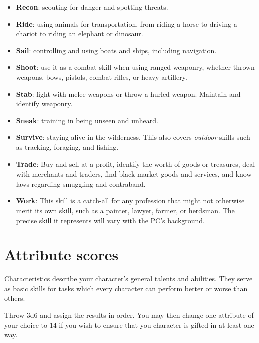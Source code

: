 \documentclass[itdr/core]{subfiles}
\begin{document}
\begin{itemize}
\item \textbf{Recon}: scouting for danger and spotting threats.

\item \textbf{Ride}:  using animals for transportation, from riding a horse to driving a chariot to riding an elephant or dinosaur.

\item \textbf{Sail}:  controlling and using boats and ships, including navigation.

\item \textbf{Shoot}: use it as a combat skill when using ranged weaponry, whether thrown weapons, bows, pistols, combat rifles, or heavy artillery.

\item \textbf{Stab}:  fight with melee weapons or throw a hurled weapon. Maintain and identify weaponry.

\item \textbf{Sneak}: training in being unseen and unheard.

\item \textbf{Survive}: staying alive in the wilderness. This also covers \emph{outdoor} skills such as tracking, foraging, and fishing.

\item \textbf{Trade}:   Buy and sell at a profit, identify the worth of goods or treasures, deal with merchants and traders, find black-market goods and services, and know laws regarding smuggling and contraband.

\item \textbf{Work}: This skill is a catch-all for any profession that might not otherwise merit its own skill, such as a painter, lawyer, farmer, or herdsman. The precise skill it represents will vary with the PC’s background.
\end{itemize}

\section{Attribute scores}
Characteristics describe your character's general talents and abilities. They serve as basic skills for tasks which every character can perform better or worse than others.

Throw 3d6 and assign the results in order. You may then change one attribute of your choice to 14 if you wish to ensure that you character is gifted in at least one way.
\end{document}
